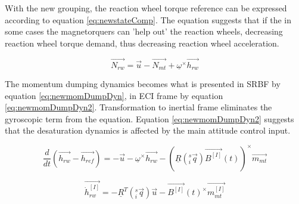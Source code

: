 With the new grouping, the reaction wheel torque reference can be expressed according to equation \ref{eq:newstateComp}. The equation suggests that if the in some cases the magnetorquers can 'help out' the reaction wheels, decreasing reaction wheel torque demand, thus decreasing reaction wheel acceleration. 

\begin{equation}
\vec{N_{rw}} =  \vec{u} - \vec{N_{mt}} +  \underline{\omega}^\times\vec{h_{rw}} 
\label{eq:newstateComp}
\end{equation}



The momentum dumping dynamics becomes what is presented in SRBF by equation \ref{eq:newmomDumpDyn}, in ECI frame by equation \ref{eq:newmomDumpDyn2}. Transformation to inertial frame eliminates the gyroscopic term from the equation. Equation \ref{eq:newmomDumpDyn2} suggests that the desaturation dynamics is affected by the main attitude control input.

\begin{equation}
\label{eq:newmomDumpDyn}
\frac{d}{dt}(\vec{h_{rw}} - \vec{h_{ref}}) = -\vec{u} - \underline{\omega}^\times\vec{h_{rw}} - \left( \underline{R}(^s_i\vec{ q})  \vec{B^{[I]}}(t)\right)^\times \vec{m_{mt}}
\end{equation}

\begin{equation}
\label{eq:newmomDumpDyn2}
\vec{\dot{h}_{rw}^{[I]}} = -\underline{R}^T(^s_i\vec{ q})\vec{u}  - \vec{B^{[I]}}(t)^\times \vec{m_{mt}^{[I]}}
\end{equation}


%

